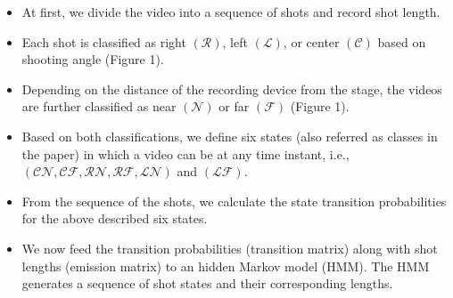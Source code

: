 \documentclass{clsfile}
\begin{document}
\begin{itemize}
\item At first, we divide the video into a sequence of shots and
record shot length.
\item Each shot is classified as right $(\mathcal{R})$, left $(\mathcal{L})$, or center $(\mathcal{C})$
based on shooting angle (Figure 1).
\item Depending on the distance of the recording device from the
stage, the videos are further classified as near $(\mathcal{N})$ or far $(\mathcal{F})$
(Figure 1).
\item Based on both classifications, we define six states (also referred as classes in the paper) in which a video can be at any
time instant, i.e., $(\mathcal{CN, CF, RN, RF, LN})$ and $(\mathcal{LF})$.
\item From the sequence of the shots, we calculate the state transition probabilities for the above described six states.

\item We now feed the transition probabilities (transition matrix)
along with shot lengths (emission matrix) to an hidden Markov
model (HMM). The HMM generates a sequence of shot states
and their corresponding lengths.


\end{itemize}
\end{document}
